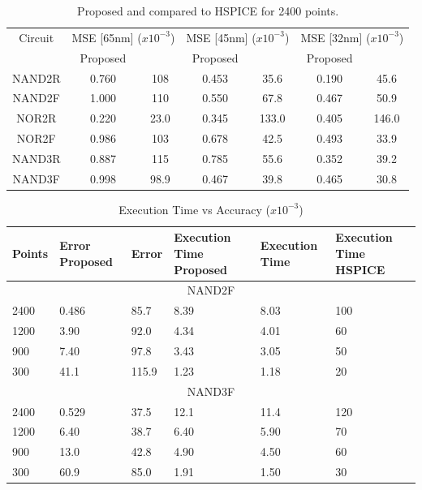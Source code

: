 \begin{table}[!htbp]
	\begin{center}
		\caption{Proposed and \cite{Accurate_Masking} compared to HSPICE for 2400 points.}
		\label{table:pt}
		\begin{tabular}{|c|c|c|c|c|c|c|}
			\hline
			Circuit & \multicolumn{2}{c|}{MSE [65nm] ($x10^{-3}$)} & \multicolumn{2}{c|}{MSE [45nm] ($x10^{-3}$)} & \multicolumn{2}{c|}{MSE [32nm] ($x10^{-3}$)} \\ 
			\cline{2-7}
			& Proposed & \cite{Accurate_Masking} & Proposed & \cite{Accurate_Masking} & Proposed & \cite{Accurate_Masking}\\
			\hline
			NAND2R & 0.760 & 108 & 0.453 & 35.6 & 0.190 & 45.6 \\
			\hline
			NAND2F & 1.000 & 110 & 0.550 & 67.8 & 0.467 & 50.9 \\
			\hline
			NOR2R & 0.220 & 23.0 & 0.345 & 133.0 & 0.405 &146.0 \\
			\hline
			NOR2F & 0.986 & 103 & 0.678 & 42.5 & 0.493 & 33.9 \\
			\hline
			NAND3R & 0.887 & 115 & 0.785 & 55.6 & 0.352 & 39.2 \\
			\hline
			NAND3F & 0.998 & 98.9 & 0.467 & 39.8 & 0.465 & 30.8 \\
			\hline
		\end{tabular}
	\end{center}
\end{table}

\begin{table}[!htbp]
	\begin{center}
			\caption{Execution Time vs Accuracy ($x10^{-3}$)}
			\label{table:extime}
			\begin{tabular}{|m{5em}|m{5em}|m{5em}|m{5em}|m{5em}|m{5em}|}
				\hline
				Points & Error \newline Proposed & Error \cite{Accurate_Masking} & Execution Time Proposed & Execution Time \cite{Accurate_Masking} & Execution Time HSPICE \\
				\hline
				\multicolumn{6}{|c|}{NAND2F} \\
				\hline
				2400 & 0.486 & 85.7 & 8.39 & 8.03 & 100\\
				\hline
				1200 & 3.90 & 92.0 & 4.34 & 4.01 & 60 \\
				\hline
				900 & 7.40 & 97.8 & 3.43 & 3.05 & 50 \\
				\hline
				300 & 41.1 & 115.9 & 1.23 & 1.18 & 20 \\
				\hline
				\multicolumn{6}{|c|}{NAND3F} \\
				\hline
				2400 & 0.529 & 37.5 & 12.1 & 11.4 & 120\\
				\hline
				1200 & 6.40 & 38.7 & 6.40 & 5.90 & 70 \\
				\hline
				900 & 13.0 & 42.8 & 4.90 & 4.50 & 60 \\
				\hline
				300 & 60.9 & 85.0 & 1.91 & 1.50 & 30 \\
				\hline
			\end{tabular}
	\end{center}
\end{table}

